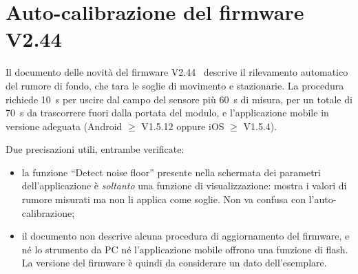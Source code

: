 \section{Auto-calibrazione del firmware V2.44}

Il documento delle novità del firmware V2.44~\cite{hilinkV244} descrive il
rilevamento automatico del rumore di fondo, che tara le soglie di movimento e
stazionarie. La procedura richiede 10~s per uscire dal campo del sensore più 60~s di
misura, per un totale di 70~s da trascorrere fuori dalla portata del modulo, e
l'applicazione mobile in versione adeguata (Android $\geq$ V1.5.12 oppure
iOS $\geq$ V1.5.4).

Due precisazioni utili, entrambe verificate:

\begin{itemize}[leftmargin=1.4em,itemsep=2pt]
  \item la funzione ``Detect noise floor'' presente nella schermata dei parametri
        dell'applicazione è \emph{soltanto} una funzione di visualizzazione: mostra i
        valori di rumore misurati ma non li applica come soglie. Non va confusa con
        l'auto-calibrazione;
  \item il documento non descrive alcuna procedura di aggiornamento del firmware, e
        né lo strumento da PC né l'applicazione mobile offrono una funzione di flash.
        La versione del firmware è quindi da considerare un dato dell'esemplare.
\end{itemize}
